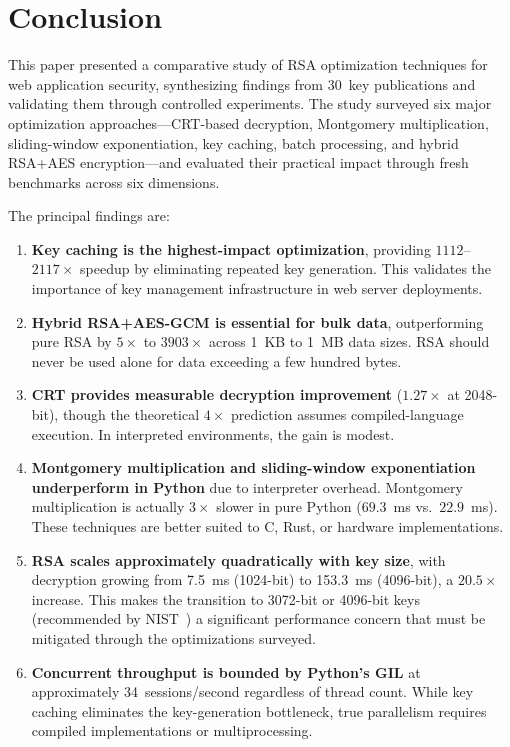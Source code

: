 \documentclass[journal]{IEEEtran}
\begin{document}
\section{Conclusion}
\label{sec:conclusion}

This paper presented a comparative study of RSA optimization techniques for web application security, synthesizing findings from 30~key publications and validating them through controlled experiments. The study surveyed six major optimization approaches---CRT-based decryption, Montgomery multiplication, sliding-window exponentiation, key caching, batch processing, and hybrid RSA+AES encryption---and evaluated their practical impact through fresh benchmarks across six dimensions.

The principal findings are:

\begin{enumerate}
    \item \textbf{Key caching is the highest-impact optimization}, providing $1112$--$2117\times$ speedup by eliminating repeated key generation. This validates the importance of key management infrastructure in web server deployments.

    \item \textbf{Hybrid RSA+AES-GCM is essential for bulk data}, outperforming pure RSA by $5\times$ to $3903\times$ across 1~KB to 1~MB data sizes. RSA should never be used alone for data exceeding a few hundred bytes.

    \item \textbf{CRT provides measurable decryption improvement} ($1.27\times$ at 2048-bit), though the theoretical $4\times$ prediction assumes compiled-language execution. In interpreted environments, the gain is modest.

    \item \textbf{Montgomery multiplication and sliding-window exponentiation underperform in Python} due to interpreter overhead. Montgomery multiplication is actually $3\times$ slower in pure Python ($69.3$~ms vs.\ $22.9$~ms). These techniques are better suited to C, Rust, or hardware implementations.

    \item \textbf{RSA scales approximately quadratically with key size}, with decryption growing from 7.5~ms (1024-bit) to 153.3~ms (4096-bit), a $20.5\times$ increase. This makes the transition to 3072-bit or 4096-bit keys (recommended by NIST~\cite{nist_sp80057}) a significant performance concern that must be mitigated through the optimizations surveyed.

    \item \textbf{Concurrent throughput is bounded by Python's GIL} at approximately 34~sessions/second regardless of thread count. While key caching eliminates the key-generation bottleneck, true parallelism requires compiled implementations or multiprocessing.
\end{enumerate}
\end{document}
